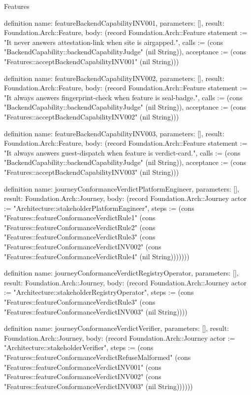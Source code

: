 \begin{lexlean}{Features}
\begin{semanticmodule}
definition{
  name: featureBackendCapabilityINV001,
  parameters: [],
  result: Foundation.Arch::Feature,
  body: (record Foundation.Arch::Feature {statement := "It never answers attestation-link when site is airgapped.", calls := (cons "BackendCapability::backendCapabilityJudge" (nil String)), acceptance := (cons "Features::acceptBackendCapabilityINV001" (nil String))})
}

definition{
  name: featureBackendCapabilityINV002,
  parameters: [],
  result: Foundation.Arch::Feature,
  body: (record Foundation.Arch::Feature {statement := "It always answers fingerprint-check when feature is seal-badge.", calls := (cons "BackendCapability::backendCapabilityJudge" (nil String)), acceptance := (cons "Features::acceptBackendCapabilityINV002" (nil String))})
}

definition{
  name: featureBackendCapabilityINV003,
  parameters: [],
  result: Foundation.Arch::Feature,
  body: (record Foundation.Arch::Feature {statement := "It always answers guest-dispatch when feature is verdict-card.", calls := (cons "BackendCapability::backendCapabilityJudge" (nil String)), acceptance := (cons "Features::acceptBackendCapabilityINV003" (nil String))})
}

definition{
  name: journeyConformanceVerdictPlatformEngineer,
  parameters: [],
  result: Foundation.Arch::Journey,
  body: (record Foundation.Arch::Journey {actor := "Architecture::stakeholderPlatformEngineer", steps := (cons "Features::featureConformanceVerdictRule1" (cons "Features::featureConformanceVerdictRule2" (cons "Features::featureConformanceVerdictRule3" (cons "Features::featureConformanceVerdictINV002" (cons "Features::featureConformanceVerdictRule4" (nil String))))))})
}

definition{
  name: journeyConformanceVerdictRegistryOperator,
  parameters: [],
  result: Foundation.Arch::Journey,
  body: (record Foundation.Arch::Journey {actor := "Architecture::stakeholderRegistryOperator", steps := (cons "Features::featureConformanceVerdictRule3" (cons "Features::featureConformanceVerdictINV003" (nil String)))})
}

definition{
  name: journeyConformanceVerdictVerifier,
  parameters: [],
  result: Foundation.Arch::Journey,
  body: (record Foundation.Arch::Journey {actor := "Architecture::stakeholderVerifier", steps := (cons "Features::featureConformanceVerdictRefuseMalformed" (cons "Features::featureConformanceVerdictINV001" (cons "Features::featureConformanceVerdictINV002" (cons "Features::featureConformanceVerdictINV003" (nil String)))))})
}


\end{semanticmodule}
\end{lexlean}

